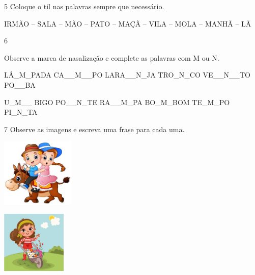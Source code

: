 
\num{5} Coloque o til nas palavras sempre que necessário.


IRMÃO -- SALA -- MÃO -- PATO -- MAÇÃ -- VILA -- MOLA -- MANHÃ -- LÃ

\num{6}

Observe a marca de nasalização e complete as palavras com M ou N.


LÂ\_M\_PADA CA\_\_M\_\_PO LARA\_\_N\_JA TRO\_N\_CO VE\_\_N\_\_TO
PO\_\_BA

U\_M\_\_ BIGO PO\_\_N\_TE RA\_\_M\_PA BO\_M\_BOM TE\_M\_PO PI\_N\_TA

\num{7} Observe as imagens e escreva uma frase para cada uma.


\includegraphics[width=1.38264in,height=1.28681in]{media/image67.jpeg}


\includegraphics[width=1.21656in,height=1.16552in]{media/image68.jpeg}

